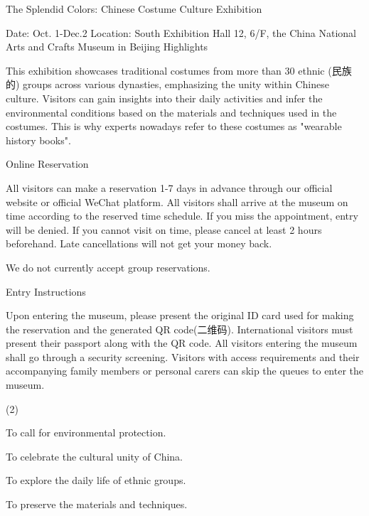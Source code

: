 \documentclass{英语试卷}
\begin{document}
\par The Splendid Colors: Chinese Costume Culture Exhibition\par
\par Date: Oct. 1-Dec.2 Location: South Exhibition Hall 12, 6/F, the China National Arts and Crafts Museum in Beijing Highlights\par
\par This exhibition showcases traditional costumes from more than 30 ethnic (民族的) groups across various dynasties, emphasizing the unity within Chinese culture. Visitors can gain insights into their daily activities and infer the environmental conditions based on the materials and techniques used in the costumes. This is why experts nowadays refer to these costumes as "wearable history books".\par
\par Online Reservation\par
\par All visitors can make a reservation 1-7 days in advance through our official website or official WeChat platform. All visitors shall arrive at the museum on time according to the reserved time schedule. If you miss the appointment, entry will be denied. If you cannot visit on time, please cancel at least 2 hours beforehand. Late cancellations will not get your money back.\par
\par We do not currently accept group reservations.\par
\par Entry Instructions\par
\par Upon entering the museum, please present the original ID card used for making the reservation and the generated QR code(二维码). International visitors must present their passport along with the QR code. All visitors entering the museum shall go through a security screening. Visitors with access requirements and their accompanying family members or personal carers can skip the queues to enter the museum.\par
{}
\begin{choices}(2)
  \item To call for environmental protection.
  \item To celebrate the cultural unity of China.
  \item To explore the daily life of ethnic groups.
  \item To preserve the materials and techniques.
\end{choices}
\end{document}
